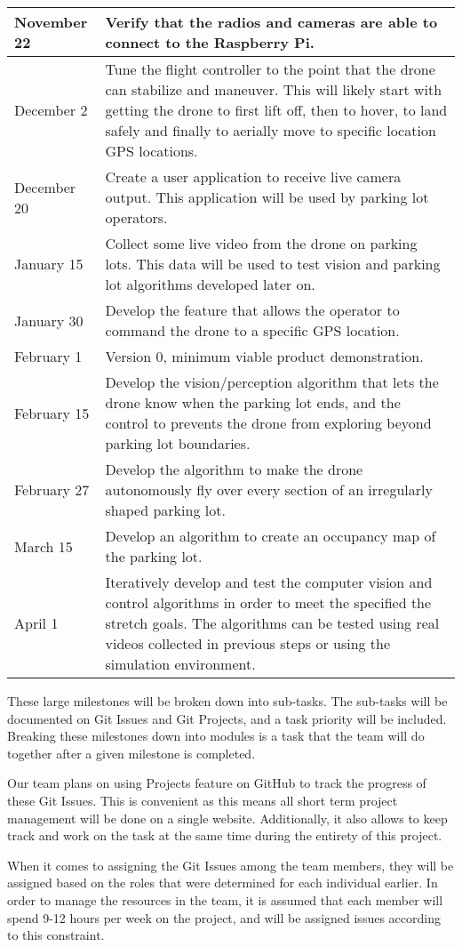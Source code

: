 \documentclass{article}
\begin{document}
\begin{table}[h]
\begin{center}
\begin{tabular}{ | m{2cm} | m{11cm} | }
\hline
November 22 & Verify that the radios and cameras are able to connect to the Raspberry Pi.\\
\hline
December 2 & Tune the flight controller to the point that the drone can stabilize and maneuver. This will likely start with getting the drone to first lift off, then to hover, to land safely and finally to aerially move to specific location GPS locations. \\
\hline
December 20 & Create a user application to receive live camera output. This application will be used by parking lot operators.\\
\hline
January 15 & Collect some live video from the drone on parking lots. This data will be used to test vision and parking lot algorithms developed later on.\\
\hline
January 30 & Develop the feature that allows the operator to command the drone to a specific GPS location.\\
\hline
February 1 & Version 0, minimum viable product demonstration. \\
\hline
February 15 & Develop the vision/perception algorithm that lets the drone know when the parking lot ends, and the control to prevents the drone from exploring beyond parking lot boundaries.\\
\hline
February 27 & Develop the algorithm to make the drone autonomously fly over every section of an irregularly shaped parking lot. \\
\hline
March 15 & Develop an algorithm to create an occupancy map of the parking lot. \\
\hline
April 1 & Iteratively develop and test the computer vision and control algorithms in order to meet the specified the stretch goals. The algorithms can be tested using real videos collected in previous steps or using the simulation environment.\\
\hline
\end{tabular}
\end{center}
\end{table}

\clearpage

These large milestones will be broken down into sub-tasks. The sub-tasks will be documented on Git Issues and Git Projects, and a task priority will be included. Breaking these milestones down into modules is a task that the team will do together after a given milestone is completed. 

Our team plans on using Projects feature on GitHub to track the progress of these Git Issues. This is convenient as this means all short term project management will be done on a single website. Additionally, it also allows to keep track and work on the task at the same time during the entirety of this project.

When it comes to assigning the Git Issues among the team members, they will be assigned based on the roles that were determined for each individual earlier. In order to manage the resources in the team, it is assumed that each member will spend 9-12 hours per week on the project, and will be assigned issues according to this constraint.
\end{document}
